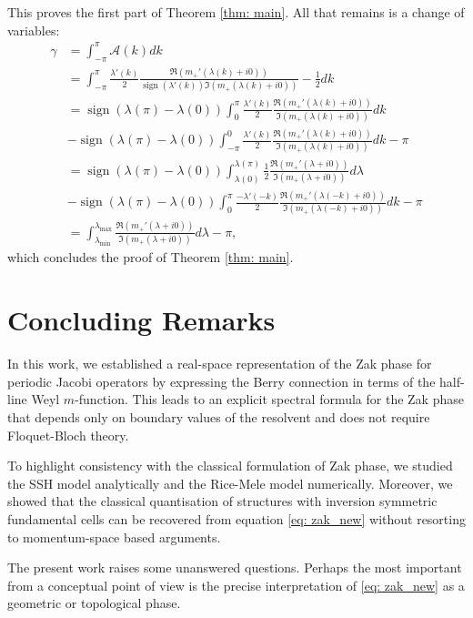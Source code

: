 \documentclass[a4paper,reqno,twoside]{amsart}
\numberwithin{equation}{section}
\theoremstyle{definition}
\newcommand{\<}{\ensuremath \leq}
\renewcommand{\>}{\ensuremath \geq}
\begin{document}
This proves the first part of Theorem \ref{thm: main}. All that remains is a change of variables:
\begin{equation}
    \begin{aligned}
        \gamma &= \int_{-\pi}^{\pi}\mathcal{A}(k)dk\\
        &=\int_{-\pi}^{\pi}\frac{\lambda'(k)}{2}\frac{\Re (m_+'(\lambda(k) + i0))}{\operatorname{sign}(\lambda'(k))\Im (m_+(\lambda(k) + i0))}-\frac{1}{2}dk\\
        &=\operatorname{sign}(\lambda(\pi)-\lambda(0))\int_0^{\pi}\frac{\lambda'(k)}{2}\frac{\Re (m_+'(\lambda(k) + i0))}{\Im (m_+(\lambda(k) + i0))}dk\\
        &-\operatorname{sign}(\lambda(\pi)-\lambda(0))\int_{-\pi}^{0}\frac{\lambda'(k)}{2}\frac{\Re (m_+'(\lambda(k) + i0))}{\Im (m_+(\lambda(k) + i0))}dk -\pi\\
        &=\operatorname{sign}(\lambda(\pi)-\lambda(0))\int_{\lambda(0)}^{\lambda(\pi)}\frac{1}{2}\frac{\Re (m_+'(\lambda + i0))}{\Im (m_+(\lambda + i0))}d\lambda\\
        &-\operatorname{sign}(\lambda(\pi)-\lambda(0))\int_0^\pi\frac{-\lambda'(-k)}{2}\frac{\Re (m_+'(\lambda(-k) + i0))}{\Im (m_+(\lambda(-k) + i0))}dk-\pi\\
        &=\int_{\lambda_{\min}}^{\lambda_{\max}}\frac{\Re (m_+'(\lambda + i0))}{\Im (m_+(\lambda + i0))}d\lambda-\pi,
    \end{aligned}
\end{equation}
which concludes the proof of Theorem \ref{thm: main}.
\section{Concluding Remarks}
In this work, we established a real-space representation of the Zak phase for periodic Jacobi operators by expressing the Berry connection in terms of the half-line Weyl $m$-function. This leads to an explicit spectral formula for the Zak phase that depends only on boundary values of the resolvent and does not require Floquet-Bloch theory.

To highlight consistency with the classical formulation of Zak phase, we studied the SSH model analytically and the Rice-Mele model numerically. Moreover, we showed that the classical quantisation of structures with inversion symmetric fundamental cells can be recovered from equation \eqref{eq: zak_new} without resorting to momentum-space based arguments.

The present work raises some unanswered questions. Perhaps the most important from a conceptual point of view is the precise interpretation of \eqref{eq: zak_new} as a geometric or topological phase.
\end{document}
